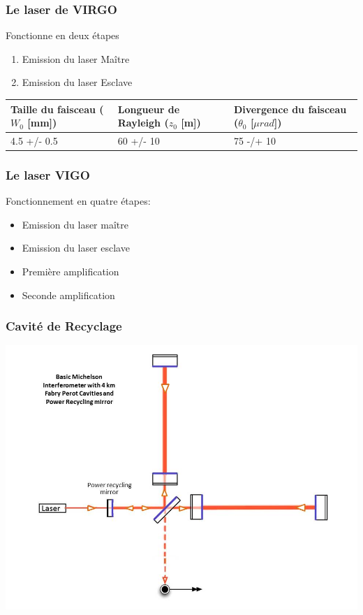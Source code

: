 \documentclass{beamer}
\begin{document}
\begin{frame}
	\frametitle{Le laser de VIRGO}
	Fonctionne en deux étapes
	\begin{enumerate}[1.]
		\item Emission du laser Maître
		\item Emission du laser Esclave 
	\end{enumerate}
	\begin{table}
	\small
	\centering
	\begin{tabular}{|l|l|l|}
	\hline
		\thead{Taille du faisceau \\ ($W_0$ [mm])}& \thead{Longueur de Rayleigh \\ ($z_0$ [m])} & \thead{Divergence du \\ faisceau ($\theta_0$ [$\mu rad$])} \\
		\hline
		4.5 +/- 0.5 & 60 +/- 10 & 75 -/+ 10 \\
		\hline
	\end{tabular}
	\end{table}

\end{frame}
\begin{frame}
\frametitle{Le laser VIGO}
Fonctionnement en quatre étapes:
\begin{itemize}
	\item Emission du laser maître
	\item Emission du laser esclave
	\item Première amplification
	\item Seconde amplification
\end{itemize}
\end{frame}

\begin{frame}
	\frametitle{Cavité de Recyclage}
	\includegraphics[height=\textheight]{Docs/recycling_mirrors.png}
\end{frame}
\end{document}
